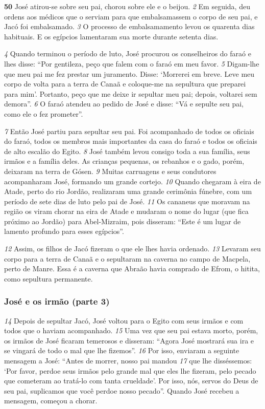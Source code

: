 \bigskip
  \textbf{\large 50} José atirou-se sobre seu pai, chorou sobre ele e o beijou. 
\textit{\tiny 2} 
Em seguida, deu
ordens aos médicos que o serviam para que embalsamassem o corpo de seu pai, e
Jacó
foi embalsamado. 
\textit{\tiny 3} 
O processo de embalsamamento levou os quarenta
dias habituais. E os egípcios lamentaram sua morte durante setenta dias. 

\bigskip
\textit{\tiny 4} 
Quando terminou o período de luto, José procurou os conselheiros do faraó e
lhes disse: “Por gentileza, peço que falem com o faraó em meu favor. 
\textit{\tiny 5} 
Digam-lhe
que meu pai me fez prestar um juramento. Disse: ‘Morrerei em breve. Leve meu
corpo de volta para a terra de Canaã e coloque-me na sepultura que preparei para
mim’. Portanto, peço que me deixe ir sepultar meu pai; depois, voltarei sem
demora”. 
\textit{\tiny 6} 
O faraó atendeu ao pedido de José e disse: “Vá e sepulte seu pai, como ele o fez
prometer”. 

\bigskip
\textit{\tiny 7} 
Então José partiu para sepultar seu pai. Foi acompanhado de todos os
oficiais do faraó, todos os membros mais importantes da casa do faraó e todos os
oficiais de alto escalão do Egito. 
\textit{\tiny 8} 
José também levou consigo toda a sua família,
seus irmãos e a família deles. As crianças pequenas, os rebanhos e o gado, porém,
deixaram na terra de Gósen. 
\textit{\tiny 9} 
Muitas carruagens e seus condutores
acompanharam José, formando um grande cortejo.  
\textit{\tiny 10}
Quando   chegaram à eira de Atade, perto do rio Jordão, realizaram uma
grande cerimônia fúnebre, com um período de sete dias de luto pelo pai de José.
\textit{\tiny 11}
Os cananeus que moravam na região os viram chorar na eira de Atade e
mudaram o nome do lugar (que fica próximo ao Jordão) para Abel-Mizraim,
pois disseram: “Este é um lugar de lamento profundo para esses egípcios”.

\bigskip
\textit{\tiny 12}
Assim, os filhos de Jacó fizeram o que ele lhes havia ordenado. 
\textit{\tiny 13}
Levaram
seu corpo para a terra de Canaã e o sepultaram na caverna no campo de Macpela,
perto de Manre. Essa é a caverna que Abraão havia comprado de Efrom, o hitita,
como sepultura permanente.

\bigskip
\subsubsection*{José e os irmão (parte 3)}
\textit{\tiny 14}
Depois de sepultar Jacó, José voltou para o Egito com seus irmãos e com todos
que o haviam acompanhado. 
\textit{\tiny 15}
Uma vez que seu pai estava morto, porém, os
irmãos de José ficaram temerosos e disseram: “Agora José mostrará sua ira e se
vingará de todo o mal que lhe fizemos”.
\textit{\tiny 16}
Por isso, enviaram a seguinte mensagem a José: “Antes de morrer, nosso pai
mandou 
\textit{\tiny 17}
que lhe disséssemos: ‘Por favor, perdoe seus irmãos pelo grande mal
que eles lhe fizeram, pelo pecado que cometeram ao tratá-lo com tanta
crueldade’. Por isso, nós, servos do Deus de seu pai, suplicamos que você perdoe
nosso pecado”. Quando José recebeu a mensagem, começou a chorar. 

